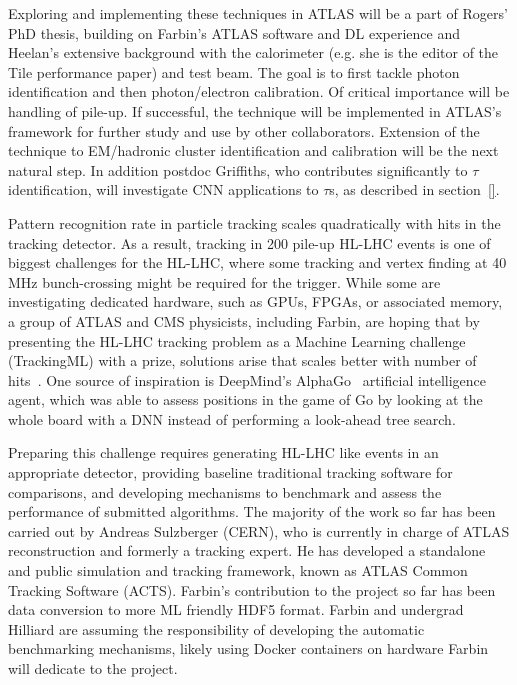 
Exploring and implementing these techniques in ATLAS will be a part of
Rogers' PhD thesis, building on Farbin's ATLAS software and DL
experience and Heelan's extensive background with the calorimeter
(e.g. she is the editor of the Tile performance paper) and test
beam. The goal is to first tackle photon identification and then
photon/electron calibration. Of critical importance will be handling
of pile-up. If successful, the technique will be implemented in
ATLAS's framework for further study and use by other
collaborators. Extension of the technique to EM/hadronic cluster
identification and calibration will be the next natural step. In
addition postdoc Griffiths, who contributes significantly to $\tau$
identification, will investigate CNN applications to $\tau$s, as
described in section~\ref{}.




Pattern recognition rate in particle tracking scales quadratically
with hits in the tracking detector. As a result, tracking in 200
pile-up HL-LHC events is one of biggest challenges for the HL-LHC,
where some tracking and vertex finding at 40 MHz bunch-crossing might
be required for the trigger. While some are investigating dedicated
hardware, such as GPUs, FPGAs, or associated memory, a group of ATLAS
and CMS physicists, including Farbin, are hoping that by presenting
the HL-LHC tracking problem as a Machine Learning challenge
(TrackingML) with a prize, solutions arise that scales better with
number of hits~\cite{}. One source of inspiration is DeepMind's
AlphaGo~\cite{} artificial intelligence agent, which was able to
assess positions in the game of Go by looking at the whole board with
a DNN instead of performing a look-ahead tree search.

Preparing this challenge requires generating HL-LHC like events in an
appropriate detector, providing baseline traditional tracking software
for comparisons, and developing mechanisms to benchmark and assess the
performance of submitted algorithms. The majority of the work so far
has been carried out by Andreas Sulzberger (CERN), who is currently in
charge of ATLAS reconstruction and formerly a tracking expert. He has
developed a standalone and public simulation and tracking framework,
known as ATLAS Common Tracking Software (ACTS). Farbin's contribution
to the project so far has been data conversion to more ML friendly
HDF5 format. Farbin and undergrad Hilliard are assuming the
responsibility of developing the automatic benchmarking mechanisms,
likely using Docker containers on hardware Farbin will dedicate to the
project.




